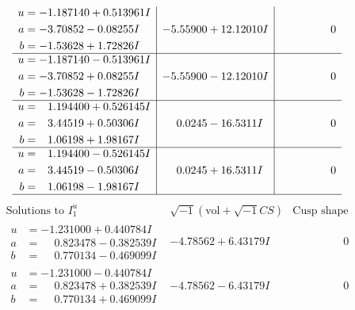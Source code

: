 \documentclass[1p]{elsarticle_modified}
\theoremstyle{definition}
\newcommand{\I}{\sqrt{-1}}
\begin{document}
$$\begin{array}{c|c|c}
\begin{aligned}
u &= -1.187140 + 0.513961 I \\
a &= -3.70852 - 0.08255 I \\
b &= -1.53628 + 1.72826 I\end{aligned}
 & -5.55900 + 12.12010 I & \phantom{-0.000000 } 0 \\ \hline\begin{aligned}
u &= -1.187140 - 0.513961 I \\
a &= -3.70852 + 0.08255 I \\
b &= -1.53628 - 1.72826 I\end{aligned}
 & -5.55900 - 12.12010 I & \phantom{-0.000000 } 0 \\ \hline\begin{aligned}
u &= \phantom{-}1.194400 + 0.526145 I \\
a &= \phantom{-}3.44519 + 0.50306 I \\
b &= \phantom{-}1.06198 + 1.98167 I\end{aligned}
 & \phantom{-}0.0245 - 16.5311 I & \phantom{-0.000000 } 0 \\ \hline\begin{aligned}
u &= \phantom{-}1.194400 - 0.526145 I \\
a &= \phantom{-}3.44519 - 0.50306 I \\
b &= \phantom{-}1.06198 - 1.98167 I\end{aligned}
 & \phantom{-}0.0245 + 16.5311 I & \phantom{-0.000000 } 0\\
 \hline 
 \end{array}$$\newpage$$\begin{array}{c|c|c}  
\text{Solutions to }I^u_{1}& \I (\text{vol} + \sqrt{-1}CS) & \text{Cusp shape}\\
 \hline 
\begin{aligned}
u &= -1.231000 + 0.440784 I \\
a &= \phantom{-}0.823478 - 0.382539 I \\
b &= \phantom{-}0.770134 - 0.469099 I\end{aligned}
 & -4.78562 + 6.43179 I & \phantom{-0.000000 } 0 \\ \hline\begin{aligned}
u &= -1.231000 - 0.440784 I \\
a &= \phantom{-}0.823478 + 0.382539 I \\
b &= \phantom{-}0.770134 + 0.469099 I\end{aligned}
 & -4.78562 - 6.43179 I & \phantom{-0.000000 } 0 \\ \hline\begin{aligned}

\end{aligned}
\end{array}$$
\end{document}
